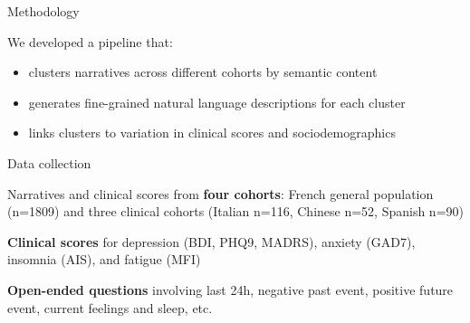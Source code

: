 \documentclass[handout,10pt]{beamer}
\begin{document}

\begin{frame}{Methodology}

  We developed a pipeline that:

  \vspace{0.5cm}
  \pause

  \begin{itemize}[<+->]
    \item clusters narratives across different cohorts by semantic content
    \item generates fine-grained natural language descriptions for each cluster
    \item links clusters to variation in clinical scores and sociodemographics
  \end{itemize}
  
\end{frame}

  

\begin{frame}{Data collection}

Narratives and clinical scores from \textbf{four cohorts}: French general population (n=1809) and three clinical cohorts (Italian n=116, Chinese n=52, Spanish n=90)

\vspace{0.5cm}
\pause

\textbf{Clinical scores} for depression (BDI, PHQ9, MADRS), anxiety (GAD7), insomnia (AIS), and fatigue (MFI)
\vspace{0.5cm}
\pause

\textbf{Open-ended questions} involving last 24h, negative past event, positive future event, current feelings and sleep, etc.

\end{frame}
\end{document}
